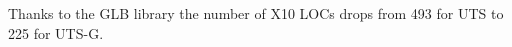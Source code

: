 Thanks to the GLB library the number of X10 LOCs drops from 493 for UTS to 225 for UTS-G.











